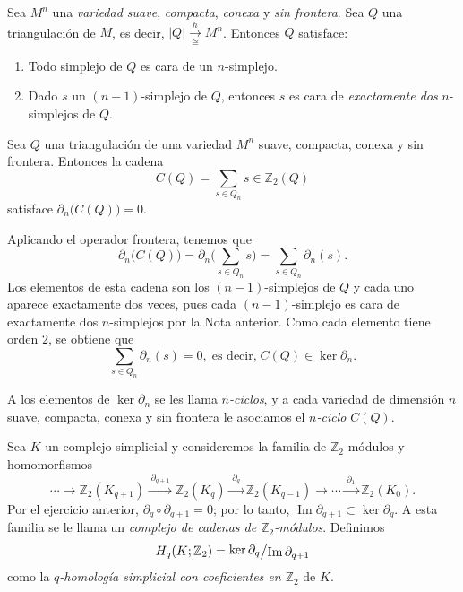\begin{nota}
Sea $M^n$ una \textit{variedad suave}, \textit{compacta}, \textit{conexa} y \textit{sin frontera}. Sea $Q$ una triangulación de $M$, es decir, $|Q| \xrightarrow[\;\cong\;]{\;h\;} M^n$. Entonces $Q$ satisface:
\begin{enumerate}
    \item Todo simplejo de $Q$ es cara de un $n$-simplejo.
    \item Dado $s$ un $(n-1)$-simplejo de $Q$, entonces $s$ es cara de \textit{exactamente dos} $n$-simplejos de $Q$.
\end{enumerate}
\end{nota}
\begin{prop}
Sea $Q$ una triangulación de una variedad $M^n$ suave, compacta, conexa y sin frontera. Entonces la cadena
\[
C(Q) = \sum_{s \in Q_n} s \in \mathbb{Z}_2(Q)
\]
satisface $\partial_n\big(C(Q)\big) = 0$.
\end{prop}

\begin{dem}
Aplicando el operador frontera, tenemos que
\[
\partial_n\big(C(Q)\big) = \partial_n\Big( \sum_{s \in Q_n} s \Big) = \sum_{s \in Q_n} \partial_n(s).
\]
Los elementos de esta cadena son los $(n-1)$-simplejos de $Q$ y cada uno aparece exactamente dos veces, pues cada $(n-1)$-simplejo es cara de exactamente dos $n$-simplejos por la Nota anterior. Como cada elemento tiene orden $2$, se obtiene que
\[
\sum_{s \in Q_n} \partial_n(s) = 0, \; \text{es decir,} \; C(Q) \in \ker \partial_n.
\]
\end{dem}

\begin{definicion}
A los elementos de $\ker \partial_n$ se les llama \textit{$n$-ciclos}, y a cada variedad de dimensión $n$ suave, compacta, conexa y sin frontera le asociamos el \textit{$n$-ciclo} $C(Q)$.
\end{definicion}

\begin{definicion}
Sea $K$ un complejo simplicial y consideremos la familia de $\mathbb{Z}_2$-módulos y homomorfismos
\[
\cdots \longrightarrow \mathbb{Z}_2(K_{q+1}) \xrightarrow{\;\partial_{q+1}\;} \mathbb{Z}_2(K_q) \xrightarrow{\;\partial_q\;} \mathbb{Z}_2(K_{q-1}) \longrightarrow \cdots \xrightarrow{\;\partial_1\;} \mathbb{Z}_2(K_0).
\]
Por el ejercicio anterior, $\partial_q \circ \partial_{q+1} = 0$; por lo tanto, $\operatorname{Im} \partial_{q+1} \subset \ker \partial_q$. A esta familia se le llama un \textit{complejo de cadenas de $\mathbb{Z}_2$-módulos}. Definimos
\[
H_q(K; \mathbb{Z}_2) = \raisebox{0.2ex}{$\ker \partial_q$} \big/ \raisebox{-0.2ex}{$\operatorname{Im} \partial_{q+1}$}
\]
como la \textit{$q$-homología simplicial con coeficientes en $\mathbb{Z}_2$} de $K$.
\end{definicion}

